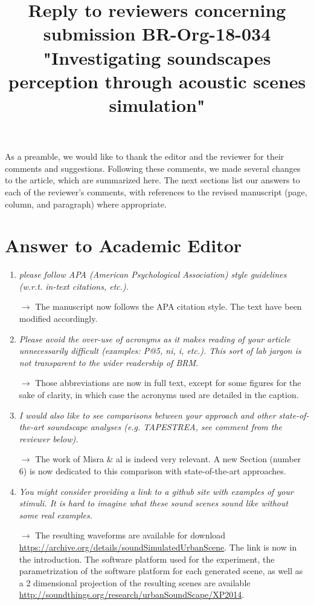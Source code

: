 \documentclass[10pt]{article}
\title{Reply to reviewers concerning submission BR-Org-18-034 "Investigating soundscapes perception through acoustic scenes simulation"}
\begin{document}
\maketitle

As a preamble, we would like to thank the editor and the reviewer for their comments and suggestions. Following these comments, we made several changes to the article, which are summarized here. The next sections list our answers to each of the reviewer’s comments, with references to the revised manuscript (page, column, and paragraph) where appropriate.

\section{Answer to Academic Editor}

\begin{enumerate}

\item \emph{please follow APA (American Psychological Association) style guidelines (w.r.t. in-text citations, etc.).}

$\rightarrow$ The manuscript now follows the APA citation style. The text have been modified accordingly.

\item \emph{ Please avoid the over-use of acronyms as it makes reading of your article unnecessarily difficult (examples: P@5, ni, i, etc.). This sort of lab jargon is not transparent to the wider readership of BRM. }

$\rightarrow$ Those abbreviations are now in full text, except for some figures for the sake of clarity, in which case the acronyms used are detailed in the caption.

\item \emph{I would also like to see comparisons between your approach and other state-of-the-art soundscape analyses (e.g. TAPESTREA, see comment from the reviewer below).}

$\rightarrow$ The work of Misra \& al is indeed very relevant. A new Section (number 6) is now dedicated to this comparison with state-of-the-art approaches.

\item \emph{You might consider providing a link to a github site with examples of your stimuli. It is hard to imagine what these sound scenes sound like without some real examples.}

$\rightarrow$ The resulting waveforms are available for download \url{https://archive.org/details/soundSimulatedUrbanScene}. The link is now in the introduction. The software platform used for the experiment, the parametrization of the software platform for each generated scene, as well as a 2 dimensional projection of the resulting scenes are available \url{http://soundthings.org/research/urbanSoundScape/XP2014}.



\end{enumerate}
\end{document}

